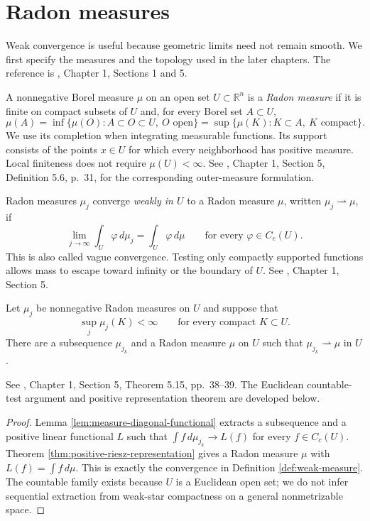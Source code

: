 \chapter{Radon measures}\label{sec:radon-measures}
Weak convergence is useful because geometric limits need not remain smooth. We first specify the measures and the topology used in the later chapters. The reference is \cite{Sim18}, Chapter 1, Sections 1 and 5.

\begin{definition}\label{def:radon-measure}
A nonnegative Borel measure $\mu$ on an open set $U\subset\mathbb{R}^n$ is a \emph{Radon measure} if it is finite on compact subsets of $U$ and, for every Borel set $A\subset U$,
\[
 \mu(A)=\inf\{\mu(O):A\subset O\subset U,\ O\text{ open}\}
       =\sup\{\mu(K):K\subset A,\ K\text{ compact}\}.
\]
We use its completion when integrating measurable functions. Its support consists of the points $x\in U$ for which every neighborhood has positive measure. Local finiteness does not require $\mu(U)<\infty$. See \cite{Sim18}, Chapter 1, Section 5, Definition 5.6, p.~31, for the corresponding outer-measure formulation.
\end{definition}

\begin{definition}\label{def:weak-measure}
Radon measures $\mu_j$ converge \emph{weakly in $U$} to a Radon measure $\mu$, written $\mu_j\rightharpoonup\mu$, if
\[
 \lim_{j\to\infty}\int_U\varphi\,d\mu_j=\int_U\varphi\,d\mu
 \qquad\text{for every }\varphi\in C_c(U).
\]
This is also called vague convergence. Testing only compactly supported functions allows mass to escape toward infinity or the boundary of $U$. See \cite{Sim18}, Chapter 1, Section 5.
\end{definition}

\begin{theorem}\label{thm:radon-compactness}
Let $\mu_j$ be nonnegative Radon measures on $U$ and suppose that
\[
 \sup_j\mu_j(K)<\infty\qquad\text{for every compact }K\subset U.
\]
There are a subsequence $\mu_{j_k}$ and a Radon measure $\mu$ on $U$ such that $\mu_{j_k}\rightharpoonup\mu$ in $U$.

See \cite{Sim18}, Chapter 1, Section 5, Theorem 5.15, pp.~38--39. The Euclidean countable-test argument and positive representation theorem are developed below.
\end{theorem}
\begin{proof}
Lemma \ref{lem:measure-diagonal-functional} extracts a subsequence and a positive linear functional $L$ such that $\int f\,d\mu_{j_k}\to L(f)$ for every $f\in C_c(U)$. Theorem \ref{thm:positive-riesz-representation} gives a Radon measure $\mu$ with $L(f)=\int f\,d\mu$. This is exactly the convergence in Definition \ref{def:weak-measure}. The countable family exists because $U$ is a Euclidean open set; we do not infer sequential extraction from weak-star compactness on a general nonmetrizable space.
\end{proof}

